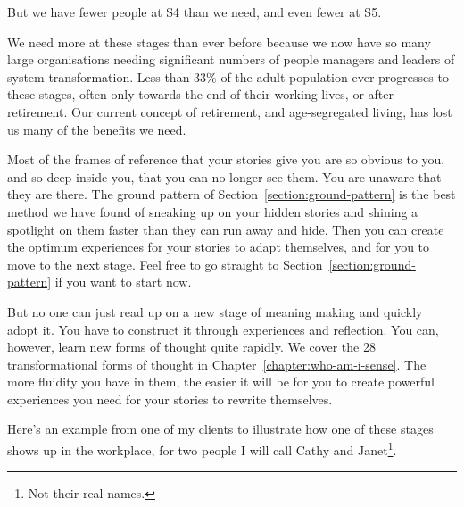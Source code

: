 But we have fewer people at S4 than we need, and even fewer at S5. 


We need more at these stages than ever before because we now have so many large organisations needing significant numbers of people managers and leaders of system transformation. Less than 33\% of the adult population ever progresses to these stages, often only towards the end of their working lives, or after retirement. Our current concept of retirement, and age-segregated living, has lost us many of the benefits we need.


Most of the frames of reference that your stories give you are so obvious to you, and so deep inside you, that you can no longer see them. You are unaware that they are there. The ground pattern of Section~\ref{section:ground-pattern} is the best method we have found of sneaking up on your hidden stories and shining a spotlight on them faster than they can run away and hide. Then you can create the optimum experiences for your stories to adapt themselves, and for you to move to the next stage. Feel free to go straight to Section~\ref{section:ground-pattern} if you want to start now.


But no one can just read up on a new stage of meaning making and quickly adopt it. You have to construct it through experiences and reflection. You can, however, learn new forms of thought quite rapidly. We cover the 28 transformational forms of thought in Chapter~\ref{chapter:who-am-i-sense}. The more fluidity you have in them, the easier it will be for you to create powerful experiences you need for your stories to rewrite themselves. 


Here's an example from one of my clients to illustrate how one of these stages shows up in the workplace, for two people I will call Cathy and Janet\footnote{Not their real names.}. 


